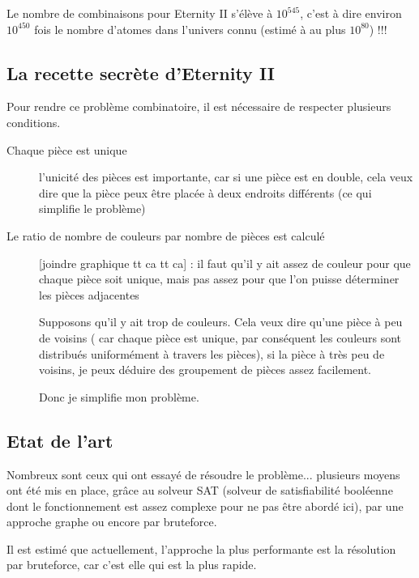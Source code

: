 \documentclass{article}
\begin{document}
	\begin{exmp}
		Le nombre de combinaisons pour Eternity II s'élève à $10^{545}$, c'est à dire environ $10^{450}$ fois le nombre d'atomes dans l'univers connu (estimé à au plus $10^{80}$) !!!
	\end{exmp}
	
	\subsection{La recette secrète d'Eternity II}
	
	Pour rendre ce problème combinatoire, il est nécessaire de respecter plusieurs conditions.
	
	\begin{description}
		\item[Chaque pièce est unique] l'unicité des pièces est importante, car si une pièce est en double, cela veux dire que la pièce peux être placée à deux endroits différents (ce qui simplifie le problème)
		\item[Le ratio de nombre de couleurs par nombre de pièces est calculé] [joindre graphique tt ca tt ca] : il faut qu'il y ait assez de couleur pour que chaque pièce soit unique, mais pas assez pour que l'on puisse déterminer les pièces adjacentes
		
		\begin{exmp}
			Supposons qu'il y ait trop de couleurs. Cela veux dire qu'une pièce à peu de voisins ( car chaque pièce est unique, par conséquent les couleurs sont distribués uniformément à travers les pièces), si la pièce à très peu de voisins, je peux déduire des groupement de pièces assez facilement.
			
			Donc je simplifie mon problème.
		\end{exmp}		
	\end{description}
	
	\subsection{Etat de l'art}
	
	Nombreux sont ceux qui ont essayé de résoudre le problème... plusieurs moyens ont été mis en place, grâce au solveur SAT (solveur de satisfiabilité booléenne dont le fonctionnement est assez complexe pour ne pas être abordé ici), par une approche graphe ou encore par bruteforce.
	
	Il est estimé que actuellement, l'approche la plus performante est la résolution par bruteforce, car c'est elle qui est la plus rapide.
	
\end{document}
